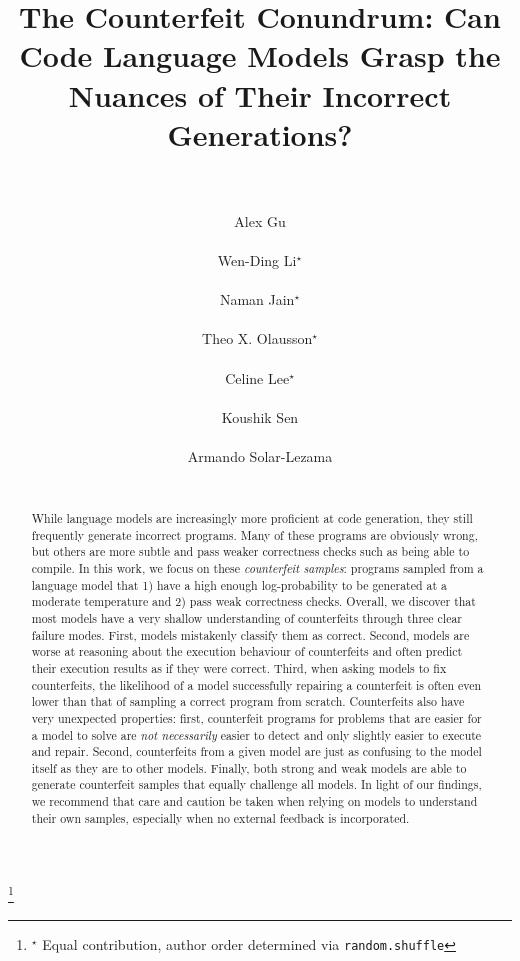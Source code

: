 \documentclass{article}
\title{The Counterfeit Conundrum: Can Code Language Models Grasp the Nuances of Their Incorrect Generations? \\ \
}
\author{\name Alex Gu
\email{gua@mit.edu} \\
\addr{MIT CSAIL} \\
\name Wen-Ding Li$^{\star}$
\email{wl678@cornell.edu} \\
\addr{Cornell University} \\
\name Naman Jain$^{\star}$
\email{naman\_jain@berkeley.edu} \\
\addr{University of California, Berkeley} \\
\name Theo X. Olausson$^{\star}$
\email{theoxo@csail.mit.edu} \\
\addr{MIT CSAIL} \\
\name Celine Lee$^{\star}$
\email{cl923@cornell.edu} \\
\addr{Cornell University} \\
\name Koushik Sen
\email{ksen@berkeley.edu} \\
\addr{University of California, Berkeley} \\
\name Armando Solar-Lezama
\email{asolar@csail.mit.edu} \\
\addr{MIT CSAIL} \\
}
\newcommand\nnfootnote[1]{%
  \begin{NoHyper}
  \renewcommand\thefootnote{}\footnote{#1}%
  \addtocounter{footnote}{-1}%
  \end{NoHyper}
}
\begin{document}
\maketitle
\raggedbottom

\nnfootnote{$^{\star}$ Equal contribution, author order determined via \texttt{random.shuffle}}

\begin{abstract}
While language models are increasingly more proficient at code generation, they still frequently generate incorrect programs. Many of these programs are obviously wrong, but others are more subtle and pass weaker correctness checks such as being able to compile. In this work, we focus on these \textit{counterfeit samples}: programs sampled from a language model that 1) have a high enough log-probability to be generated at a moderate temperature and 2) pass weak correctness checks. Overall, we discover that most models have a very shallow understanding of counterfeits through three clear failure modes. First, models mistakenly classify them as correct. Second, models are worse at reasoning about the execution behaviour of counterfeits and often predict their execution results as if they were correct. Third, when asking models to fix counterfeits, the likelihood of a model successfully repairing a counterfeit is often even lower than that of sampling a correct program from scratch. Counterfeits also have very unexpected properties: first, counterfeit programs for problems that are easier for a model to solve are \textit{not necessarily} easier to detect and only slightly easier to execute and repair. Second, counterfeits from a given model are just as confusing to the model itself as they are to other models. Finally, both strong and weak models are able to generate counterfeit samples that equally challenge all models. In light of our findings, we recommend that care and caution be taken when relying on models to understand their own samples, especially when no external feedback is incorporated.
\end{abstract}




% 










\appendix
\raggedbottom





\end{document}
